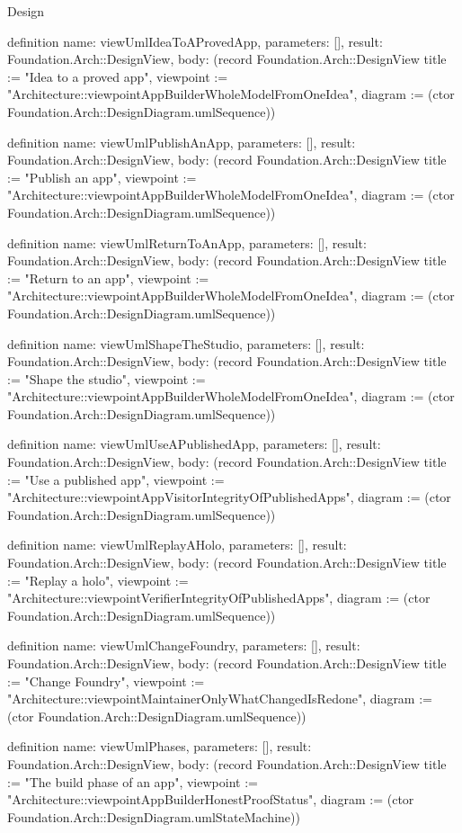 \begin{lexlean}{Design}
\begin{semanticmodule}
definition{
  name: viewUmlIdeaToAProvedApp,
  parameters: [],
  result: Foundation.Arch::DesignView,
  body: (record Foundation.Arch::DesignView {title := "Idea to a proved app", viewpoint := "Architecture::viewpointAppBuilderWholeModelFromOneIdea", diagram := (ctor Foundation.Arch::DesignDiagram.umlSequence)})
}

definition{
  name: viewUmlPublishAnApp,
  parameters: [],
  result: Foundation.Arch::DesignView,
  body: (record Foundation.Arch::DesignView {title := "Publish an app", viewpoint := "Architecture::viewpointAppBuilderWholeModelFromOneIdea", diagram := (ctor Foundation.Arch::DesignDiagram.umlSequence)})
}

definition{
  name: viewUmlReturnToAnApp,
  parameters: [],
  result: Foundation.Arch::DesignView,
  body: (record Foundation.Arch::DesignView {title := "Return to an app", viewpoint := "Architecture::viewpointAppBuilderWholeModelFromOneIdea", diagram := (ctor Foundation.Arch::DesignDiagram.umlSequence)})
}

definition{
  name: viewUmlShapeTheStudio,
  parameters: [],
  result: Foundation.Arch::DesignView,
  body: (record Foundation.Arch::DesignView {title := "Shape the studio", viewpoint := "Architecture::viewpointAppBuilderWholeModelFromOneIdea", diagram := (ctor Foundation.Arch::DesignDiagram.umlSequence)})
}

definition{
  name: viewUmlUseAPublishedApp,
  parameters: [],
  result: Foundation.Arch::DesignView,
  body: (record Foundation.Arch::DesignView {title := "Use a published app", viewpoint := "Architecture::viewpointAppVisitorIntegrityOfPublishedApps", diagram := (ctor Foundation.Arch::DesignDiagram.umlSequence)})
}

definition{
  name: viewUmlReplayAHolo,
  parameters: [],
  result: Foundation.Arch::DesignView,
  body: (record Foundation.Arch::DesignView {title := "Replay a holo", viewpoint := "Architecture::viewpointVerifierIntegrityOfPublishedApps", diagram := (ctor Foundation.Arch::DesignDiagram.umlSequence)})
}

definition{
  name: viewUmlChangeFoundry,
  parameters: [],
  result: Foundation.Arch::DesignView,
  body: (record Foundation.Arch::DesignView {title := "Change Foundry", viewpoint := "Architecture::viewpointMaintainerOnlyWhatChangedIsRedone", diagram := (ctor Foundation.Arch::DesignDiagram.umlSequence)})
}

definition{
  name: viewUmlPhases,
  parameters: [],
  result: Foundation.Arch::DesignView,
  body: (record Foundation.Arch::DesignView {title := "The build phase of an app", viewpoint := "Architecture::viewpointAppBuilderHonestProofStatus", diagram := (ctor Foundation.Arch::DesignDiagram.umlStateMachine)})
}


\end{semanticmodule}
\end{lexlean}
